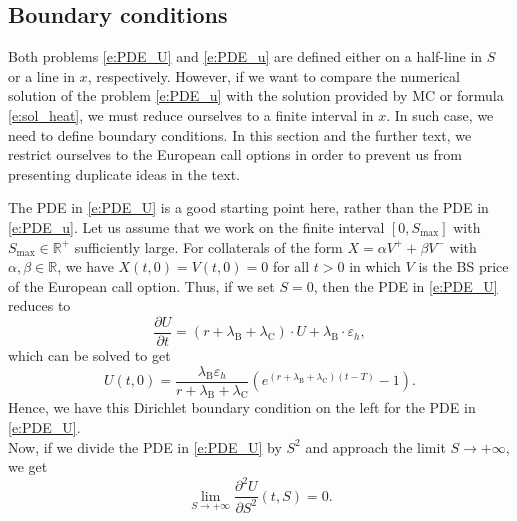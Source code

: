 \documentclass[a4paper,10pt]{article}
\newcommand{\R}{\mathbb{R}}
\newcommand{\1}{\mathbf{1}}
\begin{document}
\subsection{Boundary conditions}
\label{sec:meth_BC}
Both problems \eqref{e:PDE_U} and \eqref{e:PDE_u} are defined either on a half-line in $S$ or a line in $x$, respectively. However, if we want to compare the numerical solution of the problem \eqref{e:PDE_u} with the solution provided by MC or formula \eqref{e:sol_heat}, we must reduce ourselves to a finite interval in $x$. In such case, we need to define boundary conditions. 
In this section and the further text, we restrict ourselves to the European call options in order to prevent us from presenting duplicate ideas in the text.

The PDE in \eqref{e:PDE_U} is a good starting point here, rather than the PDE in \eqref{e:PDE_u}. Let us assume that we work on the finite interval $[0,S_{\max}]$ with $S_{\max}\in\mathbb{R}^{+}$ sufficiently large. For collaterals of the form $X=\alpha V^+ + \beta V^-$ with $\alpha,\beta\in\R$, we have $X(t,0) = V(t,0) = 0$ for all $t>0$ in which $V$ is the BS price of the European call option. Thus, if we set $S=0$, then the PDE in \eqref{e:PDE_U} reduces to
\begin{equation}
\frac{\partial U}{\partial t} = \left(r+\lambda_{\text{B}}+\lambda_{\text{C}}\right)\cdot U + \lambda_{\text{B}}\cdot\varepsilon_{h},
\end{equation}
which can be solved to get
\begin{equation}\label{e:S0_BC}
U(t,0) = \frac{\lambda_{\text{B}}\varepsilon_{h}}{r+\lambda_{\text{B}}+\lambda_{\text{C}}} \left( e^{\left(r+\lambda_{\text{B}}+\lambda_{\text{C}}\right) (t-T)} -1 \right).
\end{equation}
Hence, we have this Dirichlet boundary condition on the left for the PDE in \eqref{e:PDE_U}.\\
\indent Now, if we divide the PDE in \eqref{e:PDE_U} by $S^{2}$ and approach the limit $S\rightarrow +\infty$, we get
\begin{equation}
\lim\limits_{S\rightarrow +\infty} \frac{\partial^{2} U}{\partial S^{2}}(t,S) = 0.
\end{equation}
\end{document}
